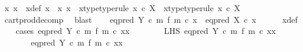 \begin{isabellebody}
\ x{}\ x{}\ \ x{\isacharunderscore}{\kern0pt}def{\isacharcolon}{\kern0pt}\ {\isachardoublequoteopen}x\ {\isacharequal}{\kern0pt}\ {\isasymlangle}x{}{\isacharcomma}{\kern0pt}\ x{}{\isasymrangle}{\isachardoublequoteclose}\ \ x{}{\isacharunderscore}{\kern0pt}type{\isacharbrackleft}{\kern0pt}type{\isacharunderscore}{\kern0pt}rule{\isacharbrackright}{\kern0pt}{\isacharcolon}{\kern0pt}\ {\isachardoublequoteopen}x{}\ {\isasymin}\isactrlsub c\ X{\isachardoublequoteclose}\ \ x{}{\isacharunderscore}{\kern0pt}type{\isacharbrackleft}{\kern0pt}type{\isacharunderscore}{\kern0pt}rule{\isacharbrackright}{\kern0pt}{\isacharcolon}{\kern0pt}\ {\isachardoublequoteopen}x{}\ {\isasymin}\isactrlsub c\ X{\isachardoublequoteclose}\isanewline
\ \ \ \ \isamarkupfalse%
\ cart{\isacharunderscore}{\kern0pt}prod{\isacharunderscore}{\kern0pt}decomp\ \isamarkupfalse%
\ blast\isanewline
\ \ \isamarkupfalse%
\ {\isachardoublequoteopen}{\isacharparenleft}{\kern0pt}eq{\isacharunderscore}{\kern0pt}pred\ Y\ {\isasymcirc}\isactrlsub c\ m\ {\isasymtimes}\isactrlsub f\ m{\isacharparenright}{\kern0pt}\ {\isasymcirc}\isactrlsub c\ x\ {\isacharequal}{\kern0pt}\ eq{\isacharunderscore}{\kern0pt}pred\ X\ {\isasymcirc}\isactrlsub c\ x{\isachardoublequoteclose}\isanewline
\ \ \ \ \isamarkupfalse%
\ x{\isacharunderscore}{\kern0pt}def\isanewline
\ \ \isamarkupfalse%
\ {\isacharparenleft}{\kern0pt}cases\ {\isachardoublequoteopen}{\isacharparenleft}{\kern0pt}eq{\isacharunderscore}{\kern0pt}pred\ Y\ {\isasymcirc}\isactrlsub c\ m\ {\isasymtimes}\isactrlsub f\ m{\isacharparenright}{\kern0pt}\ {\isasymcirc}\isactrlsub c\ {\isasymlangle}x{}{\isacharcomma}{\kern0pt}x{}{\isasymrangle}\ {\isacharequal}{\kern0pt}\ {\isasymt}{\isachardoublequoteclose}{\isacharparenright}{\kern0pt}\isanewline
\ \ \ \ \isamarkupfalse%
\ LHS{\isacharcolon}{\kern0pt}\ {\isachardoublequoteopen}{\isacharparenleft}{\kern0pt}eq{\isacharunderscore}{\kern0pt}pred\ Y\ {\isasymcirc}\isactrlsub c\ m\ {\isasymtimes}\isactrlsub f\ m{\isacharparenright}{\kern0pt}\ {\isasymcirc}\isactrlsub c\ {\isasymlangle}x{}{\isacharcomma}{\kern0pt}x{}{\isasymrangle}\ {\isacharequal}{\kern0pt}\ {\isasymt}{\isachardoublequoteclose}\isanewline
\ \ \ \ \isamarkupfalse%
\ \isamarkupfalse%
\ {\isachardoublequoteopen}eq{\isacharunderscore}{\kern0pt}pred\ Y\ {\isasymcirc}\isactrlsub c\ {\isacharparenleft}{\kern0pt}m\ {\isasymtimes}\isactrlsub f\ m{\isacharparenright}{\kern0pt}\ {\isasymcirc}\isactrlsub c\ {\isasymlangle}x{}{\isacharcomma}{\kern0pt}x{}{\isasymrangle}\ {\isacharequal}{\kern0pt}\ {\isasymt}{\isachardoublequoteclose}\isanewline

\end{isabellebody}
